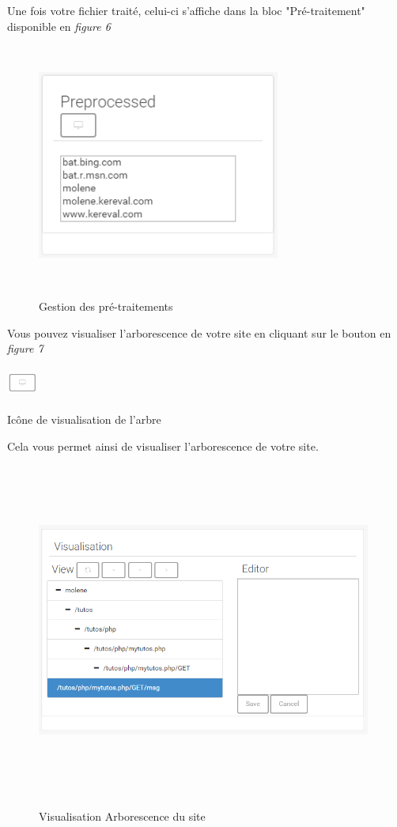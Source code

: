 \documentclass[a4paper,10pt,justified,openany]{tufte-book}
\begin{document}
Une fois votre fichier traité, celui-ci s'affiche dans la bloc "Pré-traitement" disponible en {\itshape figure 6}
\begin{figure}
\includegraphics[width=8cm, height=8cm]{./images/blocpretraitement.png}
\label{iconevueapprentissage}
\caption{Gestion des pré-traitements}
\end{figure}


Vous pouvez visualiser l'arborescence de votre site en cliquant sur le bouton en {\itshape figure 7} 

\begin{marginfigure}
\includegraphics[width=1cm, height=1cm]{./images/visupretraitement.png}
\label{iconevueapprentissage}
\caption{Icône de visualisation de l'arbre}
\end{marginfigure}

Cela vous permet ainsi de visualiser l'arborescence de votre site.

\begin{figure}
\includegraphics[width=11cm, height=11cm]{./images/arbosite.png}
\label{iconevueapprentissage}
\caption{Visualisation Arborescence du site}
\end{figure}
\end{document}
